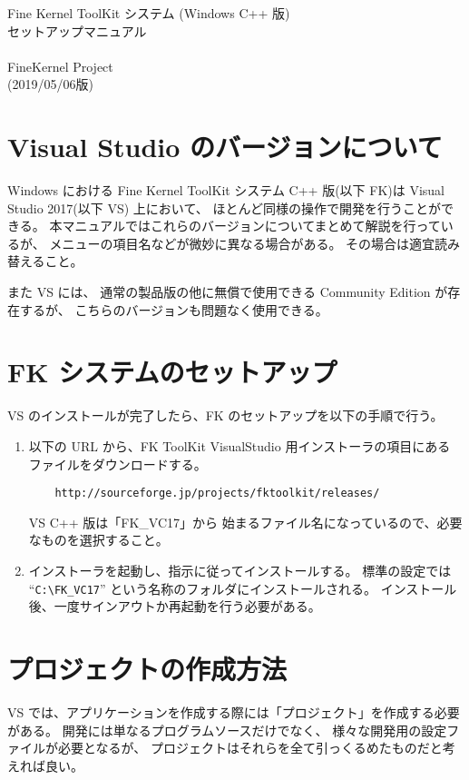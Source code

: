 \documentclass[a4j]{jarticle}
\begin{document}
\begin{center}
{\Large Fine Kernel ToolKit システム (Windows C++ 版) \\
	セットアップマニュアル} \\ ~ \\
{\Large FineKernel Project} \\
(2019/05/06版)
\end{center}


\section{Visual Studio のバージョンについて}
Windows における Fine Kernel ToolKit システム C++ 版(以下 FK)は 
Visual Studio 2017(以下 VS) 上において、
ほとんど同様の操作で開発を行うことができる。
本マニュアルではこれらのバージョンについてまとめて解説を行っているが、
メニューの項目名などが微妙に異なる場合がある。
その場合は適宜読み替えること。

また VS には、
通常の製品版の他に無償で使用できる Community Edition が存在するが、
こちらのバージョンも問題なく使用できる。

\section{FK システムのセットアップ}
VS のインストールが完了したら、FK のセットアップを以下の手順で行う。

\begin{enumerate}
\item 以下の URL から、FK ToolKit VisualStudio 用インストーラの項目にある
ファイルをダウンロードする。

\begin{verbatim}
    http://sourceforge.jp/projects/fktoolkit/releases/
\end{verbatim}

VS C++ 版は「FK\_VC17」から
始まるファイル名になっているので、必要なものを選択すること。

\item インストーラを起動し、指示に従ってインストールする。
標準の設定では ``\verb+C:\FK_VC17+'' という名称のフォルダにインストールされる。
インストール後、一度サインアウトか再起動を行う必要がある。

\end{enumerate}

\section{プロジェクトの作成方法}
VS では、アプリケーションを作成する際には「プロジェクト」を作成する必要がある。
開発には単なるプログラムソースだけでなく、
様々な開発用の設定ファイルが必要となるが、
プロジェクトはそれらを全て引っくるめたものだと考えれば良い。
\end{document}

